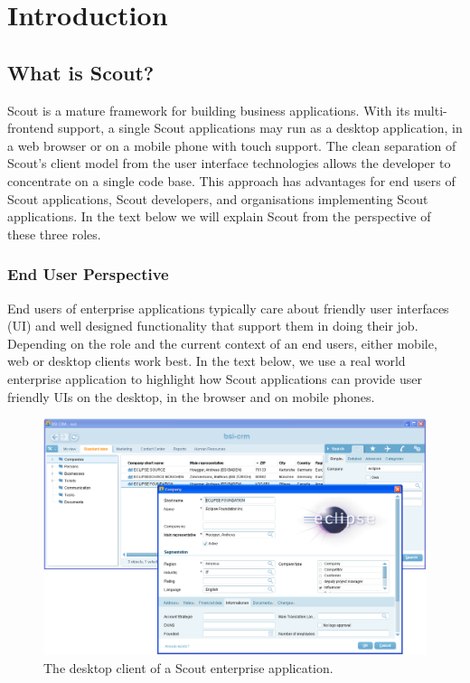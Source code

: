 \documentclass[a4paper,10pt,twoside]{book}
\begin{document}
  \sloppy
\fi


\chapter{Introduction}

\section{What is Scout?}

Scout is a mature framework for building business applications. 
With its multi-frontend support, a single Scout applications may run as a desktop application, in a web browser or on a mobile phone with touch support. 
The clean separation of Scout's client model from the user interface technologies allows the developer to concentrate on a single code base. 
This approach has advantages for end users of Scout applications, Scout developers, and organisations implementing Scout applications.
In the text below we will explain Scout from the perspective of these three roles.

\subsection{End User Perspective}

End users of enterprise applications typically care about friendly user interfaces (UI) and well designed functionality that support them in doing their job.
Depending on the role and the current context of an end users, either mobile, web or desktop clients work best.
In the text below, we use a real world enterprise application to highlight how Scout applications can provide user friendly UIs on the desktop, in the browser and on mobile phones.

\begin{figure}
\includegraphics[width=14cm]{bsi_crm_desktop.png}
\caption{The desktop client of a Scout enterprise application.}
\end{figure}
\end{document}
